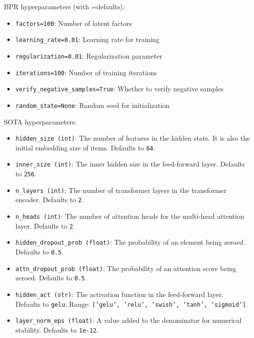 \documentclass{article}
\begin{document}
BPR hyperparameters (with =defaults):
\begin{itemize}
    \item \texttt{factors=100}: Number of latent factors
    \item \texttt{learning\_rate=0.01}: Learning rate for training
    \item \texttt{regularization=0.01}: Regularization parameter
    \item \texttt{iterations=100}: Number of training iterations
    \item \texttt{verify\_negative\_samples=True}: Whether to verify negative samples
    \item \texttt{random\_state=None}: Random seed for initialization
\end{itemize}

SOTA hyperparameters: 
\begin{itemize}
    \item \texttt{hidden\_size (int)}: The number of features in the hidden state. It is also the initial embedding size of items. Defaults to \texttt{64}.
    
    \item \texttt{inner\_size (int)}: The inner hidden size in the feed-forward layer. Defaults to \texttt{256}.
    
    \item \texttt{n\_layers (int)}: The number of transformer layers in the transformer encoder. Defaults to \texttt{2}.
    
    \item \texttt{n\_heads (int)}: The number of attention heads for the multi-head attention layer. Defaults to \texttt{2}.
    
    \item \texttt{hidden\_dropout\_prob (float)}: The probability of an element being zeroed. Defaults to \texttt{0.5}.
    
    \item \texttt{attn\_dropout\_prob (float)}: The probability of an attention score being zeroed. Defaults to \texttt{0.5}.
    
    \item \texttt{hidden\_act (str)}: The activation function in the feed-forward layer. Defaults to \texttt{gelu}. Range: \texttt{['gelu', 'relu', 'swish', 'tanh', 'sigmoid']}.
    
    \item \texttt{layer\_norm\_eps (float)}: A value added to the denominator for numerical stability. Defaults to \texttt{1e-12}.
    

\end{itemize}
\end{document}
